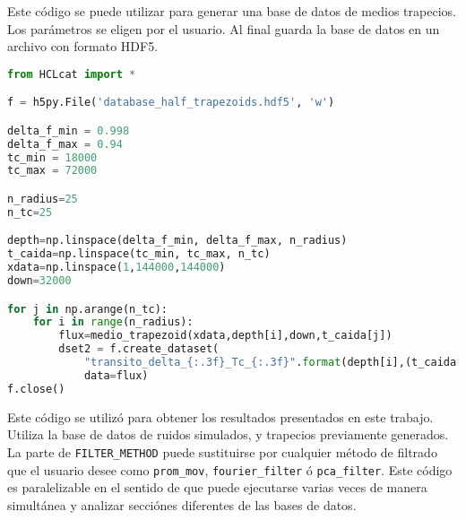 \newpage

Este código se puede utilizar para generar una base de datos de medios trapecios. Los parámetros se eligen por el usuario. Al final guarda la base de datos en un archivo con formato HDF5.

\begin{lstlisting}[language=Python]
from HCLcat import *

f = h5py.File('database_half_trapezoids.hdf5', 'w')

delta_f_min = 0.998
delta_f_max = 0.94
tc_min = 18000
tc_max = 72000

n_radius=25
n_tc=25

depth=np.linspace(delta_f_min, delta_f_max, n_radius)
t_caida=np.linspace(tc_min, tc_max, n_tc)
xdata=np.linspace(1,144000,144000)
down=32000

for j in np.arange(n_tc):
    for i in range(n_radius):
        flux=medio_trapezoid(xdata,depth[i],down,t_caida[j])
        dset2 = f.create_dataset(
			"transito_delta_{:.3f}_Tc_{:.3f}".format(depth[i],(t_caida[j]/(60*20))),
			data=flux)
f.close()

\end{lstlisting}

\newpage

Este código se utilizó para obtener los resultados presentados en este trabajo. Utiliza la base de datos de ruidos simulados, y trapecios previamente generados. La parte de \texttt{FILTER\_METHOD} puede sustituirse por cualquier método de filtrado que el usuario desee como \texttt{prom\_mov}, \texttt{fourier\_filter} ó \texttt{pca\_filter}. Este código es paralelizable en el sentido de que puede ejecutarse varias veces de manera simultánea y analizar secciónes diferentes de las bases de datos.

